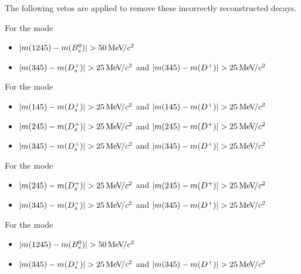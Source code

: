 The following vetos are applied to remove these incorrectly reconstructed decays.
\begin{itemize}
\item For the mode \decay{\Bp}{(\decay{\Dsp}{\Kp\Km\pip})\phiz}
\begin{itemize}
\item $|m(\text{1245})- m({{B}^0_{s}})| > 50{\mathrm{\,Me\kern -0.1em V\!/}c^2}$
\item $|m(\text{345})- m({{D}^+_{s}})| > 25{\mathrm{\,Me\kern -0.1em V\!/}c^2}$ and $|m(\text{345})- m({{D}^+})| > 25{\mathrm{\,Me\kern -0.1em V\!/}c^2}$
\end{itemize}

\item For the mode \decay{\Bp}{(\decay{\Dsp}{\pip\pim\pip})\phiz}
\begin{itemize}
\item $|m(\text{145})- m({{D}^+_{s}})| > 25{\mathrm{\,Me\kern -0.1em V\!/}c^2}$ and $|m(\text{145})- m({{D}^+})| > 25{\mathrm{\,Me\kern -0.1em V\!/}c^2}$
\item $|m(\text{245})- m({{D}^+_{s}})| > 25{\mathrm{\,Me\kern -0.1em V\!/}c^2}$ and $|m(\text{245})- m({{D}^+})| > 25{\mathrm{\,Me\kern -0.1em V\!/}c^2}$
\item $|m(\text{345})- m({{D}^+_{s}})| > 25{\mathrm{\,Me\kern -0.1em V\!/}c^2}$ and $|m(\text{345})- m({{D}^+})| > 25{\mathrm{\,Me\kern -0.1em V\!/}c^2}$
\end{itemize}
\item For the mode \decay{\Bp}{(\decay{\Dsp}{\Kp\pim\pip})\phiz}
\begin{itemize}
\item $|m(\text{245})- m({{D}^+_{s}})| > 25{\mathrm{\,Me\kern -0.1em V\!/}c^2}$ and $|m(\text{245})- m({{D}^+})| > 25{\mathrm{\,Me\kern -0.1em V\!/}c^2}$
\item $|m(\text{345})- m({{D}^+_{s}})| > 25{\mathrm{\,Me\kern -0.1em V\!/}c^2}$ and $|m(\text{345})- m({{D}^+})| > 25{\mathrm{\,Me\kern -0.1em V\!/}c^2}$
\end{itemize}
{\color{Red}
\item For the mode \decay{\Bp}{(\decay{\Dsp}{\Kp\Km\pip})\Kp\Km}
\begin{itemize}
\item $|m(\text{1245})- m({{B}^0_{s}})| > 50{\mathrm{\,Me\kern -0.1em V\!/}c^2}$
\item $|m(\text{345})- m({{D}^+_{s}})| > 25{\mathrm{\,Me\kern -0.1em V\!/}c^2}$ and $|m(\text{345})- m({{D}^+})| > 25{\mathrm{\,Me\kern -0.1em V\!/}c^2}$
\end{itemize}
}
\end{itemize}


